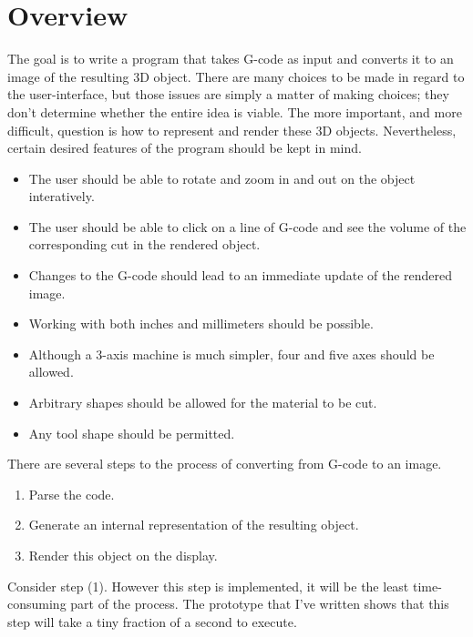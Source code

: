 \documentclass[titlepage,oneside,10pt]{article}
\begin{document}
\raggedbottom

\newcommand{\mymargin}[1]{\marginpar{\rm\tiny #1}}
\newcommand{\leftmar}[1]{\reversemarginpar \mymargin{#1}}


\section{Overview}
The goal is to write a program that takes G-code as input and converts
it to an image of the resulting 3D object. There are many choices to
be made in regard to the user-interface, but those issues are simply a
matter of making choices; they don't determine whether the entire idea
is viable. The more important, and more difficult, question is how to
represent and render these 3D objects. Nevertheless, certain desired
features of the program should be kept in mind.

\begin{itemize}
\itemsep=0pt
\item The user should be able to rotate and zoom in and out on the object
  interatively. 
\item The user should be able to click on a line of G-code and see
  the volume of the corresponding cut in the rendered object.
\item Changes to the G-code should lead to an immediate update of
  the rendered image.
\item Working with both inches and millimeters should be possible.
\item Although a 3-axis machine is much simpler, four and five axes
  should be allowed.
\item Arbitrary shapes should be allowed for the material to be cut.
\item Any tool shape should be permitted.
\end{itemize}

\noindent There are several steps to the process of converting from
G-code to an image.

\begin{enumerate}
\itemsep=0pt
\item Parse the code.
\item Generate an internal representation of the resulting object.
\item Render this object on the display.
\end{enumerate}

Consider step (1). However this step is implemented, it will be the
least time-consuming part of the process. The prototype that I've
written shows that this step will take a tiny fraction of a second to
execute.
\end{document}
